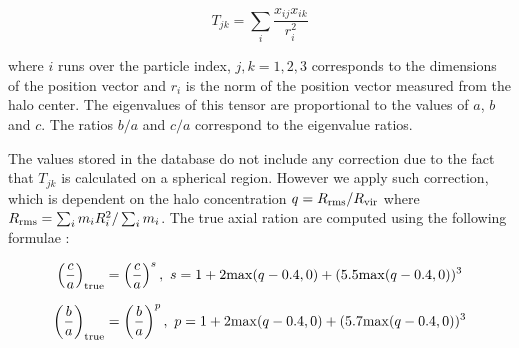 \begin{equation}
T_{jk}  = \sum_{i}\frac{x_{ij}x_{ik}}{r_i^2}
\end{equation}

where $i$ runs over the particle index, $j,k=1,2,3$ corresponds to
the dimensions of the position vector and $r_i$ is the norm of the
position vector measured from the halo center. The eigenvalues of this
tensor are proportional to the values of $a$, $b$ and $c$. The ratios
$b/a$ and $c/a$ correspond to the eigenvalue ratios.

The values stored in the database do not include any correction due to
the fact that $T_{jk}$ is calculated on a spherical region. However we
apply such correction, which is dependent on the halo concentration
$q=R_{\rm rms}/R_{\rm vir}$ where $R_{\rm rms}=\sum_i m_iR_i^2/\sum_i
  m_i$. The true axial ration are computed using the following
  formulae \citep{Riebe:2011gp}:

\begin{equation}
\left(\frac{c}{a}\right)_{\rm true}  =
\left(\frac{c}{a}\right)^s,\ s=1 + 2{\rm max}(q - 0.4,0) +(5.5{\rm max}(q-0.4,0))^3
\end{equation} 

\begin{equation}
\left(\frac{b}{a}\right)_{\rm true}  =
\left(\frac{b}{a}\right)^p,\ p=1 + 2{\rm max}(q - 0.4,0) +(5.7{\rm max}(q-0.4,0))^3
\end{equation} 
